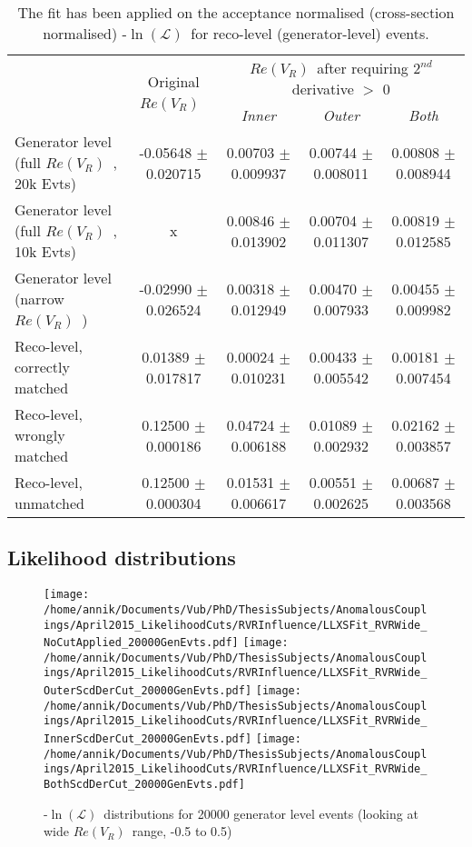 \documentclass[a4paper,10pt]{article}
\newcommand{\NegLL}{-$\ln(\mathcal{L})$~}
\newcommand{\RVR}{$Re(V_R)$~}
\begin{document}
\begin{table}[h!t]
 \caption{ The fit has been applied on the acceptance normalised (cross-section normalised) \NegLL for reco-level (generator-level) events.}
 \label{table::LLCutMT}
 \centering
 \renewcommand{\arraystretch}{1.3}
 \footnotesize
 \begin{tabular}{l|c||c|c|c}
					& \multirow{2}{*}{Original \RVR}	& \multicolumn{3}{c}{\RVR after requiring $2^{nd}$ derivative $>$ $0$}  			\\
					& 					& \textit{Inner} 		& \textit{Outer} 		& \textit{Both}			\\
  \hline
  Generator level (full \RVR, 20k Evts) & -0.05648 $\pm$ 0.020715		& 0.00703 $\pm$ 0.009937	& 0.00744 $\pm$ 0.008011	& 0.00808 $\pm$ 0.008944	\\
  Generator level (full \RVR, 10k Evts) & x					& 0.00846 $\pm$ 0.013902	& 0.00704 $\pm$ 0.011307	& 0.00819 $\pm$ 0.012585	\\
  Generator level (narrow \RVR)		& -0.02990 $\pm$ 0.026524		& 0.00318 $\pm$ 0.012949	& 0.00470 $\pm$ 0.007933	& 0.00455 $\pm$ 0.009982	\\
  Reco-level, correctly matched		& 0.01389 $\pm$ 0.017817		& 0.00024 $\pm$ 0.010231	& 0.00433 $\pm$ 0.005542	& 0.00181 $\pm$ 0.007454	\\
  Reco-level, wrongly matched 		& 0.12500 $\pm$ 0.000186		& 0.04724 $\pm$ 0.006188	& 0.01089 $\pm$ 0.002932	& 0.02162 $\pm$ 0.003857	\\
  Reco-level, unmatched 		& 0.12500 $\pm$ 0.000304		& 0.01531 $\pm$ 0.006617	& 0.00551 $\pm$ 0.002625	& 0.00687 $\pm$ 0.003568		
 \end{tabular}
\end{table}

\subsection{Likelihood distributions}

\begin{figure}[h!t]
 \centering
 \texttt{[image: /home/annik/Documents/Vub/PhD/ThesisSubjects/AnomalousCouplings/April2015\_LikelihoodCuts/RVRInfluence/LLXSFit\_RVRWide\_NoCutApplied\_20000GenEvts.pdf]}
 \texttt{[image: /home/annik/Documents/Vub/PhD/ThesisSubjects/AnomalousCouplings/April2015\_LikelihoodCuts/RVRInfluence/LLXSFit\_RVRWide\_OuterScdDerCut\_20000GenEvts.pdf]}
 \texttt{[image: /home/annik/Documents/Vub/PhD/ThesisSubjects/AnomalousCouplings/April2015\_LikelihoodCuts/RVRInfluence/LLXSFit\_RVRWide\_InnerScdDerCut\_20000GenEvts.pdf]}
 \texttt{[image: /home/annik/Documents/Vub/PhD/ThesisSubjects/AnomalousCouplings/April2015\_LikelihoodCuts/RVRInfluence/LLXSFit\_RVRWide\_BothScdDerCut\_20000GenEvts.pdf]}
 \caption{\NegLL distributions for 20000 generator level events (looking at wide \RVR range, -0.5 to 0.5)}
\end{figure}
\end{document}
